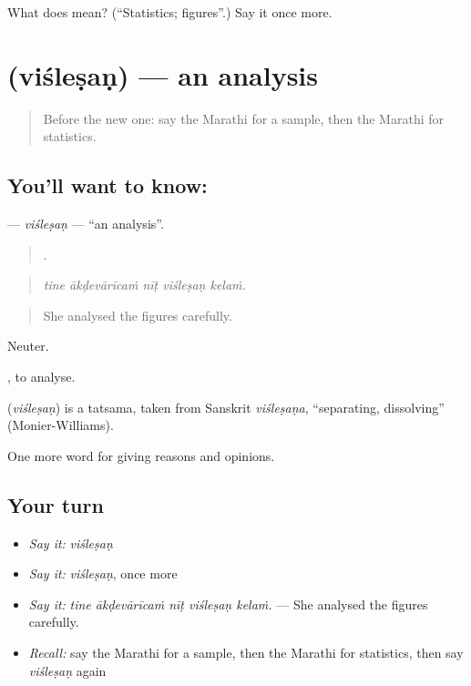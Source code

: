 \begin{tcolorbox}[breakable,colback=teal!4,colframe=teal!35!black,title={Before you move on}]
What does  mean? (\textquotedblleft{}Statistics; figures\textquotedblright{}.) Say it once more.
\end{tcolorbox}
\section[\texorpdfstring{\mr{विश्लेषण} (viśleṣaṇ)}{विश्लेषण (viśleṣaṇ)}]{ (viśleṣaṇ) — an analysis}

\label{lesson:MR-C373-vislesan}



\begin{quote}
Before the new one: say the Marathi for a sample, then the Marathi for statistics.
\end{quote}

\subsection*{You'll want to know: }
\textbf{} — \emph{viśleṣaṇ} — \textquotedblleft{}an analysis\textquotedblright{}.

\begin{quote}
    .
\end{quote}

\begin{quote}
\emph{tine ākḍevārīcaṁ nīṭ viśleṣaṇ kelaṁ.}
\end{quote}

\begin{quote}
She analysed the figures carefully.
\end{quote}

Neuter.

 , to analyse.

\begin{cousinweb}
\textbf{} (\emph{viśleṣaṇ}) is a tatsama, taken from Sanskrit \emph{viśleṣaṇa}, \textquotedblleft{}separating, dissolving\textquotedblright{} (Monier-Williams).
\end{cousinweb}

\begin{grammarlens}[title={What you've built}]
One more word for giving reasons and opinions.
\end{grammarlens}

\subsection*{Your turn}
\begin{itemize}
\raggedright
  \item \emph{Say it:} \emph{viśleṣaṇ}
  \item \emph{Say it:} \emph{viśleṣaṇ}, once more
  \item \emph{Say it:} \emph{tine ākḍevārīcaṁ nīṭ viśleṣaṇ kelaṁ.} — She analysed the figures carefully.
  \item \emph{Recall:} say the Marathi for a sample, then the Marathi for statistics, then say \emph{viśleṣaṇ} again
\end{itemize}

